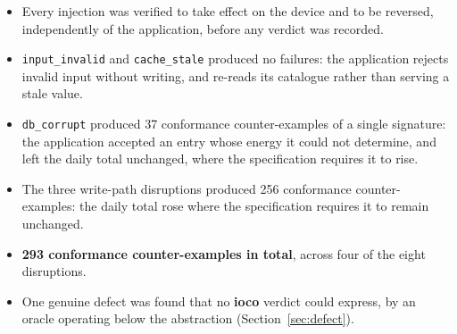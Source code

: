 \documentclass[11pt,a4paper]{article}
\newcommand{\gate}[1]{\texttt{\small #1}}
\begin{document}
\begin{itemize}\setlength\itemsep{2pt}
  \item Every injection was verified to take effect on the device and to be
        reversed, independently of the application, before any verdict was
        recorded.
  \item \gate{input\_invalid} and \gate{cache\_stale} produced no failures: the
        application rejects invalid input without writing, and re-reads its
        catalogue rather than serving a stale value.
  \item \gate{db\_corrupt} produced 37 conformance counter-examples of a single
        signature: the application accepted an entry whose energy it could not
        determine, and left the daily total unchanged, where the specification
        requires it to rise.
  \item The three write-path disruptions produced 256 conformance
        counter-examples: the daily total rose where the specification requires
        it to remain unchanged.
  \item \textbf{293 conformance counter-examples in total}, across four of the
        eight disruptions.
  \item One genuine defect was found that no \textbf{ioco} verdict could express,
        by an oracle operating below the abstraction
        (Section~\ref{sec:defect}).
\end{itemize}
\end{document}
